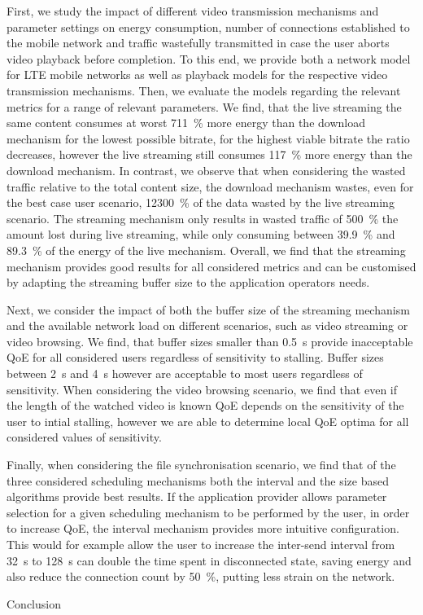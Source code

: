 First, we study the impact of different video transmission mechanisms and parameter settings on energy consumption, number of connections established to the mobile network and traffic wastefully transmitted in case the user aborts video playback before completion.
To this end, we provide both a network model for \gls{LTE} mobile networks as well as playback models for the respective video transmission mechanisms.
Then, we evaluate the models regarding the relevant metrics for a range of relevant parameters.
We find, that the live streaming the same content consumes at worst \SI{711}{\percent} more energy than the download mechanism for the lowest possible bitrate, for the highest viable bitrate the ratio decreases, however the live streaming still consumes \SI{117}{\percent} more energy than the download mechanism.
In contrast, we observe that when considering the wasted traffic relative to the total content size, the download mechanism wastes, even for the best case user scenario, \SI{12300}{\percent} of the data wasted by the live streaming scenario.
The streaming mechanism only results in wasted traffic of \SI{500}{\percent} the amount lost during live streaming, while only consuming between \SI{39.9}{\percent} and \SI{89.3}{\percent} of the energy of the live mechanism.	
Overall, we find that the streaming mechanism provides good results for all considered metrics and can be customised by adapting the streaming buffer size to the application operators needs. 

Next, we consider the impact of both the buffer size of the streaming mechanism and the available network load on different scenarios, such as video streaming or video browsing.
We find, that buffer sizes smaller than \SI{0.5}{\second} provide inacceptable \gls{QoE} for all considered users regardless of sensitivity to stalling.
Buffer sizes between \SI{2}{\second} and \SI{4}{\second} however are acceptable to most users regardless of sensitivity.
When considering the video browsing scenario, we find that even if the length of the watched video is known \gls{QoE} depends on the sensitivity of the user to intial stalling, however we are able to determine local \gls{QoE} optima for all considered values of sensitivity.

Finally, when considering the file synchronisation scenario, we find that of the three considered scheduling mechanisms both the interval and the size based algorithms provide best results.
If the application provider allows parameter selection for a given scheduling mechanism to be performed by the user, in order to increase \gls{QoE}, the interval mechanism provides more intuitive configuration.
This would for example allow the user to increase the inter-send interval from \SI{32}{\second} to \SI{128}{\second} can double the time spent in disconnected state, saving energy and also reduce the connection count by \SI{50}{\percent}, putting less strain on the network.

Conclusion